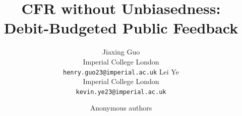 \documentclass{article}
\title{CFR without Unbiasedness:\\
Debit-Budgeted Public Feedback}
\author{
    Jiaxing Guo\\
    Imperial College London\\
    \texttt{henry.guo23@imperial.ac.uk}
    \And
    Lei Ye\\
    Imperial College London\\
    \texttt{kevin.ye23@imperial.ac.uk}
  }
\author{Anonymous authors}
\newif\ifpublicpreprint
\begin{document}
\maketitle
\ifpublicpreprint
  \lhead{Preprint}
\fi

\begin{abstract}

\end{abstract}












\appendix


\end{document}
